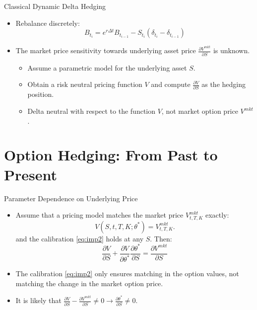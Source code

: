 \documentclass[10pt,table,mathserif]{beamer}
\newcommand{\Vmkt}{V^{mkt}}
\newcommand{\Smkt}{S}
\begin{document}
\begin{frame}{Classical Dynamic Delta Hedging}
\begin{itemize}
\item Rebalance discretely:
\[
B_{t_{i}}=e^{r \Delta t} B_{t_{i-1}}-\Smkt_{t_i}(\delta_{t_i}-\delta_{t_{i-1}})
\]
\end{itemize}
\begin{itemize}
\item  The market price sensitivity towards underlying asset price $\frac{\partial \Vmkt}{\partial S}$ is  unknown. 
\begin{itemize}
\item Assume a parametric model for the underlying asset $S$.
\item Obtain a risk neutral pricing function $V$ and compute $\frac{\partial V}{\partial S}$ as the hedging position.
\item Delta neutral with respect to the  function $V$, not market option price $\Vmkt$.
\end{itemize}
\end{itemize}
\end{frame}
\section{Option Hedging: From Past to Present}

\begin{frame}{Parameter Dependence on Underlying Price}
\begin{itemize}
\item Assume that a pricing model matches the market price $\Vmkt_{t,T,K}$ exactly:
\begin{equation} 
     V(S,t,T,K;\theta^*)=\Vmkt_{t,T,K}.
\label{eq:imp2} 
\end{equation} 
and the calibration  \eqref{eq:imp2} holds at any $S$. Then:
\begin{equation} 
\frac{\partial V}{\partial S} + \frac{\partial V}{\partial \theta^*}\frac{\partial \theta^*}{\partial S}=\frac{\partial \Vmkt}{\partial S}
\end{equation}
\item The calibration  \eqref{eq:imp2} only ensures matching in the option values, not matching the change in the market option price.
\item It is likely that $\frac{\partial V}{\partial S}-\frac{\partial \Vmkt}{\partial S} \neq 0 \rightarrow \frac{\partial \theta^*}{\partial S} \neq 0$.
\end{itemize}
\end{frame}
\end{document}
